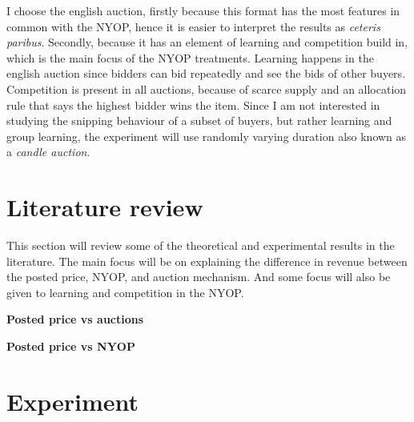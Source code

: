 \documentclass[a4paper,12pt]{article}
\begin{document}
	I choose the english auction, firstly because this format has the most features in common with the NYOP, hence it is easier to interpret the results as {\it ceteris paribus}. Secondly, because it has an element of learning and competition build in, which is the main focus of the NYOP treatments. Learning happens in the english auction since bidders can bid repeatedly and see the bids of other buyers. Competition is present in all auctions, because of scarce supply and an allocation rule that says the highest bidder wins the item. Since I am not interested in studying the snipping behaviour of a subset of buyers, but rather learning and group learning, the experiment will use randomly varying duration also known as a {\it candle auction}.

	\section{Literature review}

This section will review some of the theoretical and experimental results in the literature. The main focus will be on explaining the difference in revenue between the posted price, NYOP, and auction mechanism. And some focus will also be given to learning and competition in the NYOP.


	{\bf Posted price vs auctions}

	{\bf Posted price vs NYOP}


	\section{Experiment}
\end{document}
